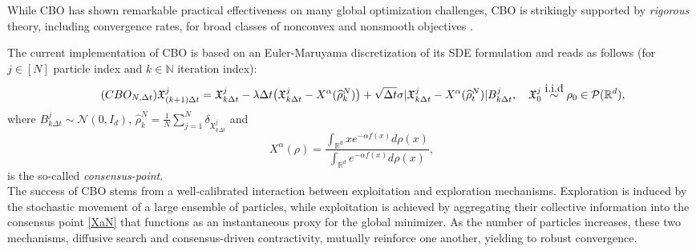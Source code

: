 \documentclass[reqno]{amsart}
\numberwithin{algorithm}{section}
\newcommand{\Xalpha}{{X^\alpha}}
\newcommand{\Xf}{{\mathfrak{X}}}
\begin{document}
{While CBO has shown remarkable practical effectiveness on many global optimization challenges, CBO  is strikingly supported by {\it rigorous} theory, including convergence rates, for broad classes of nonconvex and nonsmooth objectives \cite{B1-fornasier2021global,B1-fornasier2022globalanisotropic}. 

The current implementation of CBO is based on an Euler-Maruyama discretization of its SDE formulation and reads as follows (for $j \in [N]$ particle index and $k \in \mathbb N$ iteration index):
\begin{equation}\tag{$CBO_{N,\Delta t}$}\label{eq:cbo_finite_discrete}
 \Xf_{(k+1)\Delta t}^j =\Xf_{k \Delta t}^j -\lambda \Delta t \big(\Xf_{k \Delta t}^j -  \Xalpha(\widehat\rho^N_k)\big) + \sqrt{\Delta t} \sigma |\Xf_{k \Delta t}^j -  \Xalpha(\widehat\rho^N_t)|  B_{k \Delta t}^j, \quad \Xf_{0}^j \overset{\mbox{i.i.d}}{\sim} \rho_0 \in \mathcal P(\mathbb R^d),
\end{equation}
where $B_{k \Delta t}^j \sim \mathcal N(0,I_d)$, $ \widehat \rho^{N}_k=\frac{1}{N}\sum_{j=1}^N\delta_{\Xf_{k\Delta t}^j}$ and
\begin{equation}\label{XaN}
X^\alpha(\rho)=\frac{\int_{\mathbb R^d}x e^{-\alpha f(x)} d\rho(x)}{\int_{\mathbb R^d}e^{-\alpha f(x)} d \rho(x)},
\end{equation}
is the so-called {\it consensus-point}.\\

The success of CBO stems from a well-calibrated  interaction between exploitation and exploration mechanisms. Exploration is induced by the stochastic movement of a large ensemble of particles, while exploitation is achieved by aggregating their collective information into the consensus point \eqref{XaN} that functions as an instantaneous proxy for the global minimizer. As the number of particles increases, these two mechanisms, diffusive search and consensus-driven contractivity, mutually reinforce one another, yielding to robust convergence.\\

}
\end{document}
